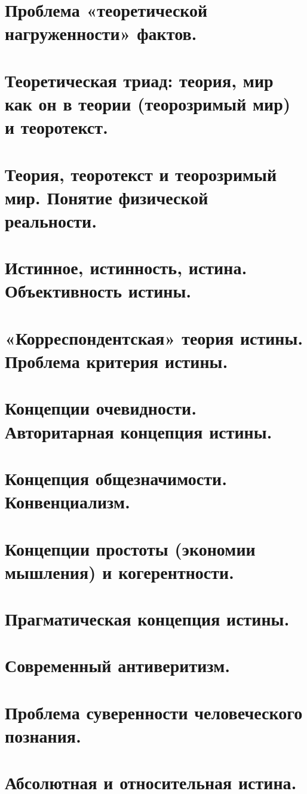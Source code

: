 \section{ Проблема «теоретической нагруженности» фактов.}
\section{ Теоретическая триад: теория, мир как он в теории (теорозримый мир) и теоротекст.}
\section{ Теория, теоротекст и теорозримый мир. Понятие физической реальности.}
\section{ Истинное, истинность, истина. Объективность истины.}
\section{ «Корреспондентская» теория истины. Проблема критерия истины.}
\section{ Концепции очевидности. Авторитарная концепция истины.}
\section{ Концепция общезначимости. Конвенциализм.}
\section{ Концепции простоты (экономии мышления) и когерентности.}
\section{ Прагматическая концепция истины.}
\section{ Современный антиверитизм.}
\section{ Проблема суверенности человеческого познания.}
\section{ Абсолютная и относительная истина.}
